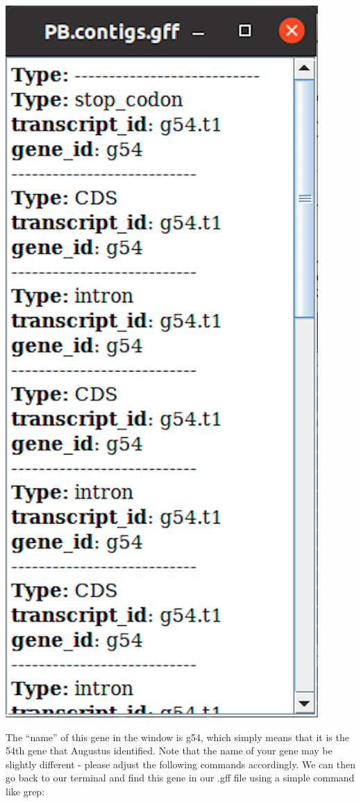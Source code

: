 \documentclass[11pt]{article}
\begin{document}
\includegraphics{images/IGV_2.png}

The ``name'' of this gene in the window is g54, which simply means that
it is the 54th gene that Augustus identified. Note that the name of your
gene may be slightly different - please adjust the following commands
accordingly. We can then go back to our terminal and find this gene in
our .gff file using a simple command like grep:
\end{document}
